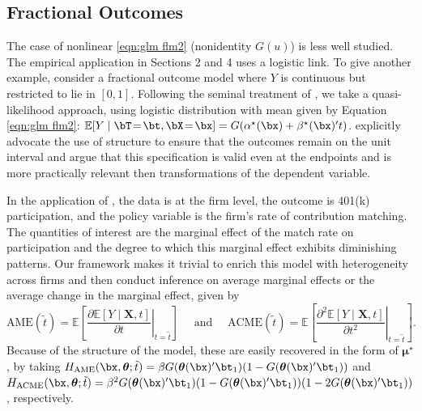 \documentclass[12pt]{article}
\numberwithin{equation}{section}
\theoremstyle{definition}
\newcommand{\E}{\mathbb{E}}
\newcommand{\bmu}{\boldsymbol{\mu}}
\newcommand{\btheta}{\boldsymbol{\theta}}
\newcommand{\bmtrue}{\bmu^\star}
\newcommand{\atrue}{\alpha^\star}
\newcommand{\btrue}{\beta^\star}
\newcommand{\tstar}{\tilde{t}}
\begin{document}
\begin{appendices}
\subsection{Fractional Outcomes}

The case of nonlinear \eqref{eqn:glm flm2} (nonidentity $G(u)$) is less well studied. The empirical application in Sections 2 and 4 uses a logistic link. To give another example, consider a fractional outcome model where $Y$ is continuous but restricted to lie in $[0,1]$. Following the seminal treatment of \cite{Papke-Wooldridge1996_JAE}, we take a quasi-likelihood approach, using logistic distribution with mean given by Equation \eqref{eqn:glm flm2}: $\E[Y \mid \bT \!=\! \bt, \bX \!=\! \bx] = G(\atrue(\bx) + \btrue(\bx)'t)$. \cite{Papke-Wooldridge1996_JAE} explicitly advocate the use of structure to ensure that the outcomes remain on the unit interval and argue that this specification is valid even at the endpoints and is more practically relevant then transformations of the dependent variable.

In the application of \cite{Papke-Wooldridge1996_JAE}, the data is at the firm level, the outcome is 401(k) participation, and the policy variable is the firm's rate of contribution matching. The quantities of interest are the marginal effect of the match rate on participation and the degree to which this marginal effect exhibits diminishing patterns. Our framework makes it trivial to enrich this model with heterogeneity across firms and then conduct inference on average marginal effects or the average change in the marginal effect, given by
\[
    \text{AME}\left(\tstar\right)=\mathbb{E}\left[\left.\frac{\partial \mathbb{E}[Y\mid\mathbf{X},t]}{\partial t}\right|_{t=\tstar}\right]
    \quad \text{ and } \quad
    \text{ACME}\left(\tstar\right)=\mathbb{E}\left[\left.\frac{\partial^{2}\mathbb{E}[Y\mid\mathbf{X},t]}{\partial t^{2}}\right|_{t=\tstar}\right].
\]
Because of the structure of the model, these are easily recovered in the form of $\bmtrue$, 
by taking $H_{\text{AME}}(\bx, \btheta;\tstar) = \beta G(\btheta(\bx)'\bt_1) (1-G(\btheta(\bx)'\bt_1))$ and $H_{\text{ACME}}(\bx, \btheta;\tstar) = {\beta}^2 G(\btheta(\bx)'\bt_1)(1-G(\btheta(\bx)'\bt_1))(1-2G(\btheta(\bx)'\bt_1))$, respectively. 



\end{appendices}
\end{document}
